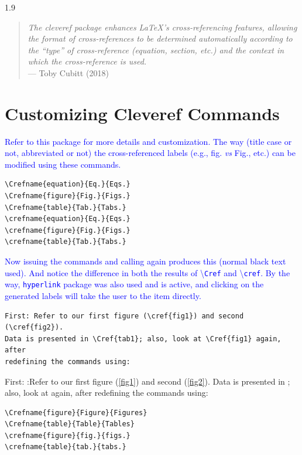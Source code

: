 \documentclass[phd]{ndsu-thesis-2022}
\newcommand\myspacing{1.9}      %
\newcommand\italk[1]{\textcolor{blue}{#1}}  %
\newcommand\cmd[1]{\textbackslash\texttt{#1}}  %
\begin{document}
\begin{spacing}{\myspacing}
\vspace{-4ex}
\textcolor{magenta}{
\begin{quote}
\singlespacing
\raggedleft
\textit{The cleveref package enhances \LaTeX's cross-referencing features, allowing the format of cross-references to be determined automatically according to the ``type'' of cross-reference (equation, section, etc.) and the context in which the cross-reference is used.} 
\\\hfill --- Toby Cubitt (2018)
\end{quote}
}

\section{Customizing Cleveref Commands}
\italk{Refer to this package for more details and customization. The way (title case or not, abbreviated or not) the cross-referenced labels (e.g., fig. \emph{vs} Fig., etc.) can be modified using these commands. 
}

\begin{verbatim}
\Crefname{equation}{Eq.}{Eqs.}
\Crefname{figure}{Fig.}{Figs.}
\Crefname{table}{Tab.}{Tabs.}
\crefname{equation}{Eq.}{Eqs.}
\crefname{figure}{Fig.}{Figs.}
\crefname{table}{Tab.}{Tabs.}
\end{verbatim}

\italk{Now issuing the commands and calling again produces this (normal black text used). And notice the difference in both the results of \cmd{Cref} and \cmd{cref}. By the way, \texttt{hyperlink} package was also used and is active, and clicking on the generated labels will take the user to the item directly. }


{\singlespacing
\begin{verbatim}
First: Refer to our first figure (\cref{fig1}) and second (\cref{fig2}). 
Data is presented in \Cref{tab1}; also, look at \Cref{fig1} again, after 
redefining the commands using:
\end{verbatim}
}
First: :Refer to our first figure (\cref{fig1}) and second (\cref{fig2}). Data is presented in ; also, look at  again, after redefining the commands using:

\begin{verbatim}
\Crefname{figure}{Figure}{Figures}
\Crefname{table}{Table}{Tables}
\crefname{figure}{fig.}{figs.}
\crefname{table}{tab.}{tabs.}
\end{verbatim}


\end{spacing}
\end{document}
